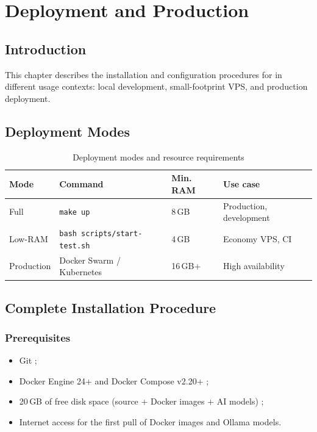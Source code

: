 \chapter{Deployment and Production}

\section*{Introduction}

This chapter describes the installation and configuration procedures for \caimp{}
in different usage contexts: local development, small-footprint VPS, and production
deployment.

\section{Deployment Modes}

\begin{table}[H]
\centering
\caption{Deployment modes and resource requirements}
\label{tab:deploy-modes}
\begin{tabularx}{\textwidth}{lXXX}
\toprule
\textbf{Mode} & \textbf{Command} & \textbf{Min. RAM} & \textbf{Use case} \\
\midrule
Full       & \texttt{make up}                      & 8\,GB & Production, development \\
Low-RAM    & \texttt{bash scripts/start-test.sh}   & 4\,GB & Economy VPS, CI \\
Production & Docker Swarm / Kubernetes             & 16\,GB+ & High availability \\
\bottomrule
\end{tabularx}
\end{table}

\section{Complete Installation Procedure}

\subsection{Prerequisites}

\begin{itemize}
  \item Git ;
  \item Docker Engine 24+ and Docker Compose v2.20+ ;
  \item 20\,GB of free disk space (source + Docker images + AI models) ;
  \item Internet access for the first pull of Docker images and Ollama models.
\end{itemize}

